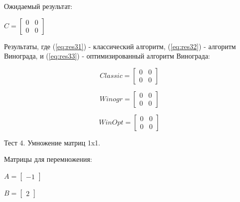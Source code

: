 \documentclass[12pt,a4paper]{scrartcl}
\begin{document}
Ожидаемый результат:

\begin{center}
		\begin{math}\label{eq:res3}
		C =\begin{bmatrix}
		0 & 0 \\
		0 & 0 
		\end{bmatrix}
		\end{math}
\end{center}

Результаты, где (\ref{eq:res31}) - классический алгоритм, (\ref{eq:res32}) - алгоритм Винограда, и (\ref{eq:res33}) - оптимизированный алгоритм Винограда:

\begin{center}
	\begin{minipage}[c][3cm][c]{0,3\textwidth}
		\begin{equation}\label{eq:res31}
		Classic =\begin{bmatrix}
		0 & 0 \\
		0 & 0 
		\end{bmatrix}
		\end{equation}
	\end{minipage}	
	\begin{minipage}[c][3cm][c]{0,3\textwidth}
		\begin{equation}\label{eq:res32}
		Winogr =\begin{bmatrix}
		0 & 0 \\
		0 & 0 
		\end{bmatrix}
		\end{equation}
	\end{minipage}	
	\begin{minipage}[c][3cm][c]{0,3\textwidth}
		\begin{equation}\label{eq:res33}
		WinOpt =\begin{bmatrix}
		0 & 0 \\
		0 & 0 
		\end{bmatrix}
		\end{equation}
	\end{minipage}
\end{center}

Тест 4. Умножение матриц 1x1.

Матрицы для перемножения:

\begin{minipage}[c][3cm][c]{0,5\textwidth}
	\begin{math}\label{eq:test41}
	A =\begin{bmatrix}
	-1
	\end{bmatrix}
	\end{math}
\end{minipage}
\begin{minipage}[c][3cm][c]{0,5\textwidth}
	\begin{math}\label{eq:test42}
	B =\begin{bmatrix}
	2 
	\end{bmatrix}
	\end{math}
\end{minipage}
\end{document}
